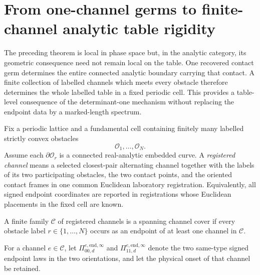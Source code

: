 \section{From one-channel germs to finite-channel analytic table rigidity}
\label{sec:v22-multichannel-rigidity}

The preceding theorem is local in phase space but, in the analytic category,
its geometric consequence need not remain local on the table.  One recovered
contact germ determines the entire connected analytic boundary carrying that
contact.  A finite collection of labelled channels which meets every obstacle
therefore determines the whole labelled table in a fixed periodic cell.  This
provides a table-level consequence of the determinant-one mechanism without
replacing the endpoint data by a marked-length spectrum.

Fix a periodic lattice and a fundamental cell containing finitely many
labelled strictly convex obstacles
\[
                 \mathcal O_1,\ldots,\mathcal O_N.
\]
Assume each $\partial\mathcal O_r$ is a connected real-analytic embedded
curve.  A \emph{registered channel} means a selected closest-pair alternating
channel together with the labels of its two participating obstacles, the two
contact points, and the oriented contact frames in one common Euclidean
laboratory registration.  Equivalently, all signed endpoint coordinates are
reported in registrations whose Euclidean placements in the fixed cell are
known.

\begin{definition}
\label{def:v22-channel-cover}
A finite family $\mathscr C$ of registered channels is a spanning channel
cover if every obstacle label $r\in\{1,\ldots,N\}$ occurs as an endpoint of
at least one channel in $\mathscr C$.
\end{definition}

For a channel $e\in\mathscr C$, let
$\Pi^{e,\mathrm{end},\infty}_{00,d}$ and
$\Pi^{e,\mathrm{end},\infty}_{11,d}$ denote the two same-type signed endpoint
laws in the two orientations, and let the physical onset of that channel be
retained.


